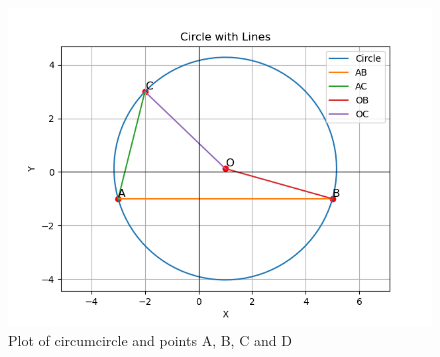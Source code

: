 \documentclass[journal,12pt,twocolumn]{IEEEtran}
\theoremstyle{remark}
\begin{document}
\begin{figure}[!ht]
              \centering
              \includegraphics[width=\columnwidth]{./figs/fig1.4.6.png}
              \caption{Plot of circumcircle and points A, B, C and D}
              \label{fig:15}
\end{figure}
\end{document}
